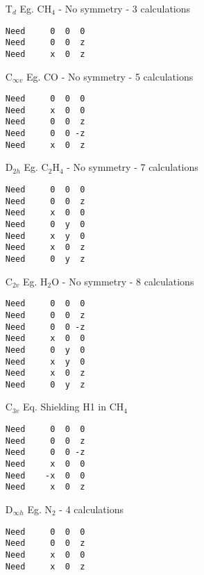 \begin{itemize}
\item[T$_d$]   Eg. CH$_4$ - No symmetry - 3 calculations

\begin{verbatim}
Need     0  0  0
Need     0  0  z
Need     x  0  z
\end{verbatim}

\item[C$_{\infty v}$] Eg. CO - No symmetry - 5 calculations

\begin{verbatim}
Need     0  0  0
Need     x  0  0
Need     0  0  z
Need     0  0 -z
Need     x  0  z
\end{verbatim}

\item[D$_{2h}$] Eg. C$_2$H$_4$ -  No symmetry - 7 calculations

\begin{verbatim}
Need     0  0  0
Need     0  0  z
Need     x  0  0
Need     0  y  0
Need     x  y  0
Need     x  0  z
Need     0  y  z
\end{verbatim}

\item[C$_{2v}$] Eg. H$_2$O - No symmetry - 8 calculations

\begin{verbatim}
Need     0  0  0
Need     0  0  z
Need     0  0 -z
Need     x  0  0
Need     0  y  0
Need     x  y  0
Need     x  0  z
Need     0  y  z
\end{verbatim}

\item[C$_{3v}$] Eq. Shielding H1 in CH$_4$

\begin{verbatim}
Need     0  0  0
Need     0  0  z
Need     0  0 -z
Need     x  0  0
Need    -x  0  0
Need     x  0  z
\end{verbatim}

\item[D$_{\infty h}$] Eg. N$_2$ -  4 calculations

\begin{verbatim}
Need     0  0  0
Need     0  0  z
Need     x  0  0
Need     x  0  z
\end{verbatim}
\end{itemize}
